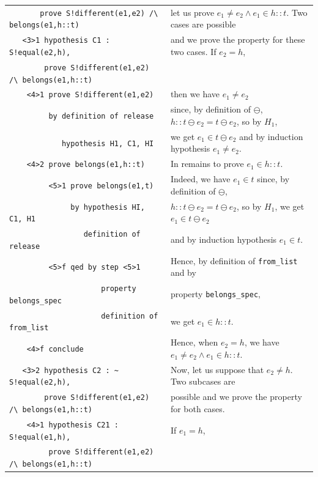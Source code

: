 \documentclass[submission,copyright,creativecommons]{eptcs}
\begin{document}
\begin{table}
\begin{center}
{\begin{tabular}{|ll|}
\\
\verb+       prove S!different(e1,e2) /\ belongs(e1,h::t)+ 
& let us prove $e_1 \neq e_2 \land e_1 \in h::t$. Two cases are possible\\
\verb+   <3>1 hypothesis C1 : S!equal(e2,h),+ & and we prove the property for these
two cases.  If $e_2=h$,  \\
\verb+        prove S!different(e1,e2) /\ belongs(e1,h::t)+ & \\
\verb+    <4>1 prove S!different(e1,e2)+& then we have $e_1 \neq e_2$ \\
\verb+         by definition of release+& since, by definition of $\ominus$,
$h::t \ominus e_2 = t \ominus e_2$, so by $H_1$,  \\
\verb+            hypothesis H1, C1, HI+& we get  $e_1 \in t \ominus e_2$ and by induction hypothesis $e_1 \neq e_2$.\\
\verb+    <4>2 prove belongs(e1,h::t)+& In remains to prove $e_1 \in
h::t$. \\
\verb+         <5>1 prove belongs(e1,t)+ &  Indeed, we have $e_1 \in
t$ since, by definition of $\ominus$, \\
\verb+              by hypothesis HI, C1, H1+ & 
$h::t \ominus e_2 = t \ominus e_2$, so by $H_1$, we get  $e_1 \in t \ominus e_2$
 \\
\verb+                 definition of release+ & 
and by induction hypothesis $e_1 \in t$.
\\
\verb+         <5>f qed by step <5>1+ & Hence, by definition of
\verb+from_list+ and by\\ 
\verb+                     property belongs_spec+ & property
\verb+belongs_spec+, \\
\verb+                     definition of from_list+ & we get $e_1 \in h::t$.\\
\verb+    <4>f conclude+ & Hence, when $e_2=h$, we have $e_1 \neq e_2
\land e_1 \in h::t$.\\
\verb+   <3>2 hypothesis C2 : ~ S!equal(e2,h),+ & Now, let us suppose
that $e_2 \neq h$. Two subcases are \\
\verb+        prove S!different(e1,e2) /\ belongs(e1,h::t)+ & possible
and we prove the property for both cases.\\
\verb+    <4>1 hypothesis C21 : S!equal(e1,h),+& If $e_1=h$,\\
\verb+         prove S!different(e1,e2) /\ belongs(e1,h::t)+ & \\

\end{tabular}}
\end{center}
\end{table}
\end{document}
